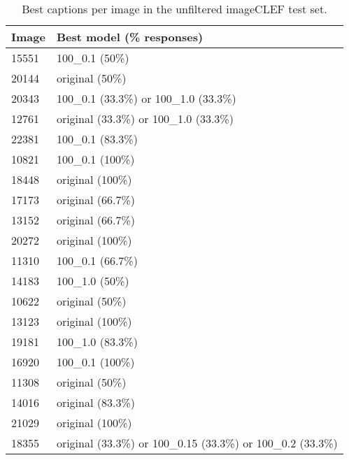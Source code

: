 \documentclass[11pt]{article}
\begin{document}
\begin{table}[h]
\begin{center}
\begin{tabular}{|p{1cm}|p{4.5cm}|}
\hline \bf Image & \bf Best model (\% responses) \\ \hline
15551 & 100\_0.1 (50\%)  \\
20144 & original (50\%)  \\
20343 & 100\_0.1 (33.3\%) or 100\_1.0 (33.3\%)  \\
12761 & original (33.3\%) or 100\_1.0 (33.3\%)  \\
22381 & 100\_0.1 (83.3\%) \\
10821 & 100\_0.1 (100\%) \\
18448 & original (100\%) \\
17173 & original (66.7\%) \\
13152 & original (66.7\%)  \\
20272 & original (100\%)  \\
11310 & 100\_0.1 (66.7\%)  \\
14183 & 100\_1.0 (50\%)  \\
10622 & original (50\%)  \\
13123 & original (100\%)   \\
19181 & 100\_1.0 (83.3\%) \\
16920 & 100\_0.1 (100\%) \\
11308 & original (50\%) \\
14016 & original (83.3\%) \\
21029 & original (100\%) \\
18355 & original (33.3\%) or 100\_0.15 (33.3\%) or 100\_0.2 (33.3\%) \\
\hline
\end{tabular}
\end{center}
\caption{\label{unfiltered-table} Best captions per image in the unfiltered imageCLEF test set. }
\end{table}
\end{document}
